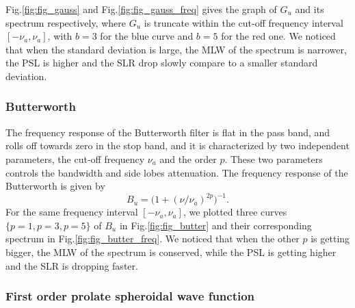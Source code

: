 \documentclass[useAMS,usenatbib]{mn2e}
\begin{document}
Fig.\ref{fig:fig_gauss} and Fig.\ref{fig:fig_gauss_freq} gives the graph of $G_{u}$ and its spectrum respectively, where $G_{u}$ 
is truncate within the cut-off frequency interval $[-\nu_a,\nu_a]$, with $b = 3$ for the blue curve and $b=5$ for the red one. We noticed 
that when the standard deviation is large, the MLW of the spectrum is narrower, the PSL is higher and the SLR drop slowly compare to a 
smaller standard deviation.
\subsubsection{Butterworth}
The frequency response of the Butterworth filter is flat  in the pass band, and rolls off towards zero in the stop band, and it is 
characterized by two independent parameters, the cut-off frequency 
$\nu_a$ and the order $p$. These two parameters controls the 
bandwidth and side lobes  attenuation. The frequency response of the Butterworth is given by 
\begin{equation}
B_u= \Big(1 + (\nu/\nu_a)^{2p}\Big)^{-1}.
\end{equation}
For the same frequency interval $[-\nu_a,\nu_a]$, we plotted  three curves $\{p=1, p=3, p=5\}$ of $B_{u}$ in Fig.\ref{fig:fig_butter} and 
their corresponding spectrum in Fig.\ref{fig:fig_butter_freq}.  We noticed 
that when the other $p$ is getting bigger, the MLW of the spectrum is conserved, while the PSL is getting higher and the SLR is 
dropping  faster.
\subsubsection{First order prolate spheroidal wave function}
\end{document}
